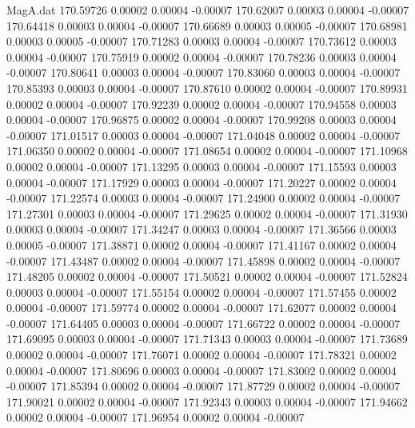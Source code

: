 \begin{filecontents}{MagA.dat}
 170.59726    0.00002    0.00004   -0.00007
 170.62007    0.00003    0.00004   -0.00007
 170.64418    0.00003    0.00004   -0.00007
 170.66689    0.00003    0.00005   -0.00007
 170.68981    0.00003    0.00005   -0.00007
 170.71283    0.00003    0.00004   -0.00007
 170.73612    0.00003    0.00004   -0.00007
 170.75919    0.00002    0.00004   -0.00007
 170.78236    0.00003    0.00004   -0.00007
 170.80641    0.00003    0.00004   -0.00007
 170.83060    0.00003    0.00004   -0.00007
 170.85393    0.00003    0.00004   -0.00007
 170.87610    0.00002    0.00004   -0.00007
 170.89931    0.00002    0.00004   -0.00007
 170.92239    0.00002    0.00004   -0.00007
 170.94558    0.00003    0.00004   -0.00007
 170.96875    0.00002    0.00004   -0.00007
 170.99208    0.00003    0.00004   -0.00007
 171.01517    0.00003    0.00004   -0.00007
 171.04048    0.00002    0.00004   -0.00007
 171.06350    0.00002    0.00004   -0.00007
 171.08654    0.00002    0.00004   -0.00007
 171.10968    0.00002    0.00004   -0.00007
 171.13295    0.00003    0.00004   -0.00007
 171.15593    0.00003    0.00004   -0.00007
 171.17929    0.00003    0.00004   -0.00007
 171.20227    0.00002    0.00004   -0.00007
 171.22574    0.00003    0.00004   -0.00007
 171.24900    0.00002    0.00004   -0.00007
 171.27301    0.00003    0.00004   -0.00007
 171.29625    0.00002    0.00004   -0.00007
 171.31930    0.00003    0.00004   -0.00007
 171.34247    0.00003    0.00004   -0.00007
 171.36566    0.00003    0.00005   -0.00007
 171.38871    0.00002    0.00004   -0.00007
 171.41167    0.00002    0.00004   -0.00007
 171.43487    0.00002    0.00004   -0.00007
 171.45898    0.00002    0.00004   -0.00007
 171.48205    0.00002    0.00004   -0.00007
 171.50521    0.00002    0.00004   -0.00007
 171.52824    0.00003    0.00004   -0.00007
 171.55154    0.00002    0.00004   -0.00007
 171.57455    0.00002    0.00004   -0.00007
 171.59774    0.00002    0.00004   -0.00007
 171.62077    0.00002    0.00004   -0.00007
 171.64405    0.00003    0.00004   -0.00007
 171.66722    0.00002    0.00004   -0.00007
 171.69095    0.00003    0.00004   -0.00007
 171.71343    0.00003    0.00004   -0.00007
 171.73689    0.00002    0.00004   -0.00007
 171.76071    0.00002    0.00004   -0.00007
 171.78321    0.00002    0.00004   -0.00007
 171.80696    0.00003    0.00004   -0.00007
 171.83002    0.00002    0.00004   -0.00007
 171.85394    0.00002    0.00004   -0.00007
 171.87729    0.00002    0.00004   -0.00007
 171.90021    0.00002    0.00004   -0.00007
 171.92343    0.00003    0.00004   -0.00007
 171.94662    0.00002    0.00004   -0.00007
 171.96954    0.00002    0.00004   -0.00007

\end{filecontents}

